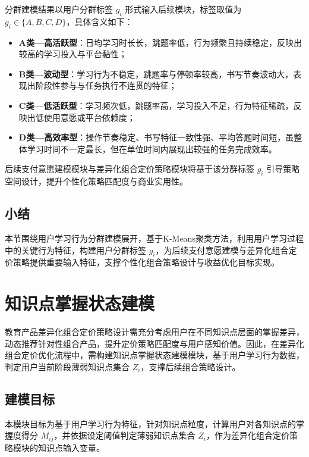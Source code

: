 分群建模结果以用户分群标签 $g_i$ 形式输入后续模块，标签取值为 $g_i \in \{A, B, C, D\}$，具体含义如下：

\begin{itemize}
  \item \textbf{A类—高活跃型}：日均学习时长长，跳题率低，行为频繁且持续稳定，反映出较高的学习投入与平台黏性；
  
  \item \textbf{B类—波动型}：学习行为不稳定，跳题率与停顿率较高，书写节奏波动大，表现出阶段性参与与任务执行不连贯的特征；
  
  \item \textbf{C类—低活跃型}：学习频次低，跳题率高，学习投入不足，行为特征稀疏，反映出低使用意愿或平台依赖度；
  
  \item \textbf{D类—高效率型}：操作节奏稳定、书写特征一致性强、平均答题时间短，虽整体学习时间不一定最长，但在单位时间内展现出较强的任务完成效率。
\end{itemize}


后续支付意愿建模模块与差异化组合定价策略模块将基于该分群标签 $g_i$ 引导策略空间设计，提升个性化策略匹配度与商业实用性。

\subsection*{小结}

本节围绕用户学习行为分群建模展开，基于K-Means聚类方法，利用用户学习过程中的关键行为特征，构建用户分群标签 $g_i$，为后续支付意愿建模与差异化组合定价策略提供重要输入特征，支撑个性化组合策略设计与收益优化目标实现。

\section{知识点掌握状态建模}
\label{sec:知识点掌握状态建模}

教育产品差异化组合定价策略设计需充分考虑用户在不同知识点层面的掌握差异，动态推荐针对性组合产品，提升定价策略匹配度与用户感知价值。因此，在差异化组合定价优化流程中，需构建知识点掌握状态建模模块，基于用户学习行为数据，判定用户当前阶段薄弱知识点集合 $Z_i$，支撑后续组合策略设计。

\subsection{建模目标}

本模块目标为基于用户学习行为特征，针对知识点粒度，计算用户对各知识点的掌握度得分 $M_{ij}$，并依据设定阈值判定薄弱知识点集合 $Z_i$，作为差异化组合定价策略模块的知识点输入变量。

